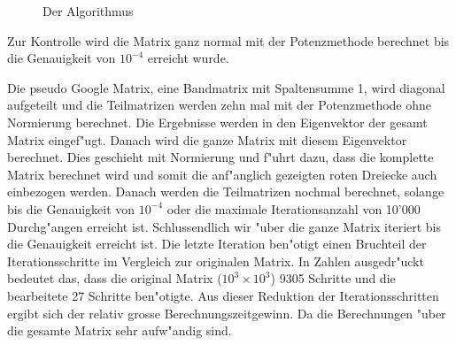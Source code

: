 \begin{refsection}
\begin{figure}[H]
\begin{center}
    \end{center}
\caption{Der Algorithmus}
\label{12}
\end{figure}

 
Zur Kontrolle wird die Matrix ganz normal mit der Potenzmethode berechnet bis die Genauigkeit von $10^{-4}$ erreicht wurde.

Die pseudo Google Matrix, eine Bandmatrix mit Spaltensumme 1, wird diagonal aufgeteilt und die Teilmatrizen werden zehn mal mit der Potenzmethode ohne Normierung berechnet. Die Ergebnisse werden in den Eigenvektor der gesamt Matrix eingef"ugt. Danach wird die ganze Matrix mit diesem Eigenvektor berechnet. Dies geschieht mit Normierung und f"uhrt dazu, dass die komplette Matrix berechnet wird und somit die anf"anglich gezeigten roten Dreiecke auch einbezogen werden. Danach werden die Teilmatrizen nochmal berechnet, solange bis die Genauigkeit von $10^{-4}$ oder die maximale Iterationsanzahl von 10'000 Durchg"angen erreicht ist. Schlussendlich wir "uber die ganze Matrix iteriert bis die Genauigkeit erreicht ist. Die letzte Iteration ben"otigt einen Bruchteil der Iterationsschritte im Vergleich zur originalen Matrix. In Zahlen ausgedr"uckt bedeutet das, dass die original Matrix ($10^3\times10^3$) 9305 Schritte und die bearbeitete 27 Schritte ben"otigte. Aus dieser Reduktion der Iterationsschritten ergibt sich der relativ grosse Berechnungszeitgewinn. Da die Berechnungen "uber die gesamte Matrix sehr aufw"andig sind. 

\end{refsection}
